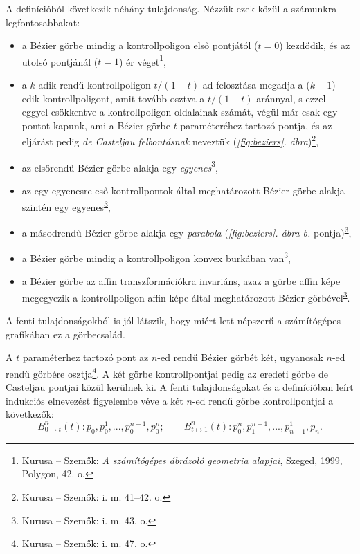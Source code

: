 \documentclass[12pt]{report}
\theoremstyle{definition}
\begin{document}
A definícióból következik néhány tulajdonság. Nézzük ezek közül a számunkra
legfontosabbakat:
\begin{itemize}[noitemsep,topsep=0pt]
  \item a Bézier görbe mindig a kontrollpoligon első pontjától ($t=0$) kezdődik,
  és az utolsó pontjánál ($t=1$) ér véget\footnote{Kurusa -- Szemők: \emph{A
  számítógépes ábrázoló geometria alapjai}, Szeged, 1999, Polygon, 42. o.},
  \item a $k$-adik rendű kontrollpoligon $t/(1-t)$-ad felosztása megadja a
  ($k-1$)-edik kontrollpoligont, amit tovább osztva a $t/(1-t)$ aránnyal, s
  ezzel eggyel csökkentve a kontrollpoligon oldalainak számát, végül már csak
  egy pontot kapunk, ami a Bézier görbe $t$ paraméteréhez tartozó pontja, és az
  eljárást pedig \emph{de Casteljau felbontásnak} neveztük
  (\emph{\ref{fig:beziers}. ábra})\footnote{Kurusa -- Szemők: i. m. 41--42. o.},
  \item az elsőrendű Bézier görbe alakja egy \emph{egyenes}\footnote{Kurusa --
  Szemők: i. m. 43. o.\label{fn:Kurusa:43p}},
  \item az egy egyenesre eső kontrollpontok által meghatározott Bézier görbe
  alakja szintén egy egyenes\textsuperscript{\ref{fn:Kurusa:43p}},
  \item a másodrendű Bézier görbe alakja egy \emph{parabola}
  (\emph{\ref{fig:beziers}. ábra b.} pontja)\textsuperscript{\ref{fn:Kurusa:43p}},
  \item a Bézier görbe mindig a kontrollpoligon konvex burkában
  van\textsuperscript{\ref{fn:Kurusa:43p}},
  \item a Bézier görbe az affin transzformációkra invariáns, azaz a görbe affin
  képe megegyezik a kontrollpoligon affin képe által meghatározott Bézier
  görbével\textsuperscript{\ref{fn:Kurusa:43p}}.
\end{itemize}

A fenti tulajdonságokból is jól látszik, hogy miért lett népszerű a számítógépes
grafikában ez a görbecsalád.

A $t$ paraméterhez tartozó pont az $n$-ed rendű Bézier görbét két, ugyancsak
$n$-ed rendű görbére osztja\footnote{Kurusa -- Szemők: i. m. 47. o.}. A két
görbe kontrollpontjai pedig az eredeti görbe de Casteljau pontjai közül kerülnek
ki. A fenti tulajdonságokat és a definícióban leírt indukciós elnevezést
figyelembe véve a két $n$-ed rendű görbe kontrollpontjai a következők:
\begin{equation}\label{eq:1} B_{0\mapsto t}^n(t): p_0, p_0^1, ..., p_0^{n-1},
p_0^n; \qquad B_{t\mapsto 1}^n(t): p_0^n, p_1^{n-1}, ..., p_{n-1}^1, p_n.
\end{equation}
\end{document}
